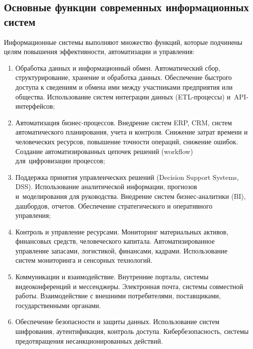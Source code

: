 \documentclass{ou}
\begin{document}
\subsection{Основные функции современных информационных систем}
Информационные системы выполняют множество функций, которые подчинены целям повышения эффективности, автоматизации и управления:
\begin{enumerate}[leftmargin=0em, itemindent=3.75em, nosep, label=\arabic*)]
\item Обработка данных и информационный обмен. Автоматический сбор, структурирование, хранение и обработка данных. Обеспечение быстрого доступа к сведениям и обмена ими между участниками предприятия или общества. Использование систем интеграции данных (ETL-процессы) и~API-интерфейсов;
\item Автоматизация бизнес-процессов. Внедрение систем ERP, CRM, систем автоматического планирования, учета и контроля. Снижение затрат времени и человеческих ресурсов, повышение точности операций, снижение ошибок. Создание автоматизированных цепочек решений (workflow) для~цифровизации процессов;
\item Поддержка принятия управленческих решений (Decision Support Systems, DSS). Использование аналитической информации, прогнозов и~моделирования для руководства. Внедрение систем бизнес-аналитики (BI), дашбордов, отчетов. Обеспечение стратегического и оперативного управления;
\item Контроль и управление ресурсами. Мониторинг материальных активов, финансовых средств, человеческого капитала. Автоматизированное управление запасами, логистикой, финансами, кадрами. Использование систем мониторинга и сенсорных технологий.
\item Коммуникации и взаимодействие. Внутренние порталы, системы видеоконференций и мессенджеры. Электронная почта, системы совместной работы. Взаимодействие с внешними потребителями, поставщиками, государственными органами.
\item Обеспечение безопасности и защиты данных. Использование систем шифрования, аутентификация, контроль доступа. Кибербезопасность, системы предотвращения несанкционированных действий.
\end{enumerate}
\end{document}
